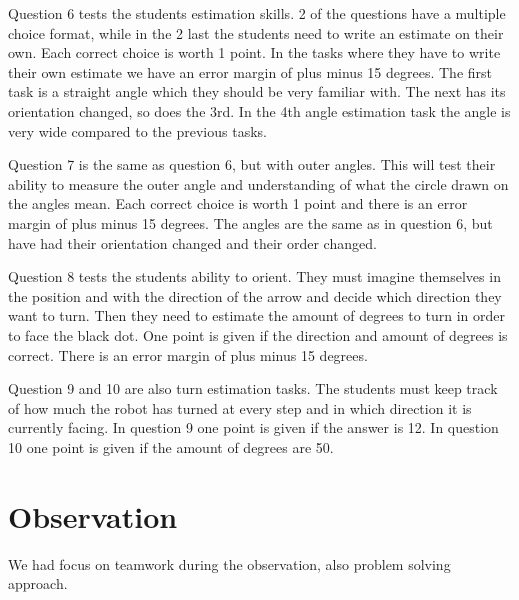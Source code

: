 \bigskip\noindent
Question 6 tests the students estimation skills. 2 of the questions have a multiple choice format, while in the 2 last the students need to write an estimate on their own. Each correct choice is worth 1 point. In the tasks where they have to write their own estimate we have an error margin of plus minus 15 degrees. The first task is a straight angle which they should be very familiar with. The next has its orientation changed, so does the 3rd. In the 4th angle estimation task the angle is very wide compared to the previous tasks. 

\bigskip\noindent
Question 7 is the same as question 6, but with outer angles. This will test their ability to measure the outer angle and understanding of what the circle drawn on the angles mean. Each correct choice is worth 1 point and there is an error margin of plus minus 15 degrees. The angles are the same as in question 6, but have had their orientation changed and their order changed. 

\bigskip\noindent
Question 8 tests the students ability to orient. They must imagine themselves in the position and with the direction of the arrow and decide which direction they want to turn. Then they need to estimate the amount of degrees to turn in order to face the black dot. One point is given if the direction and amount of degrees is correct. There is an error margin of plus minus 15 degrees. 

\bigskip\noindent
Question 9 and 10 are also turn estimation tasks. The students must keep track of how much the robot has turned at every step and in which direction it is currently facing. In question 9 one point is given if the answer is 12. In question 10 one point is given if the amount of degrees are 50. 

\section{Observation}
We had focus on teamwork during the observation, also problem solving approach. 